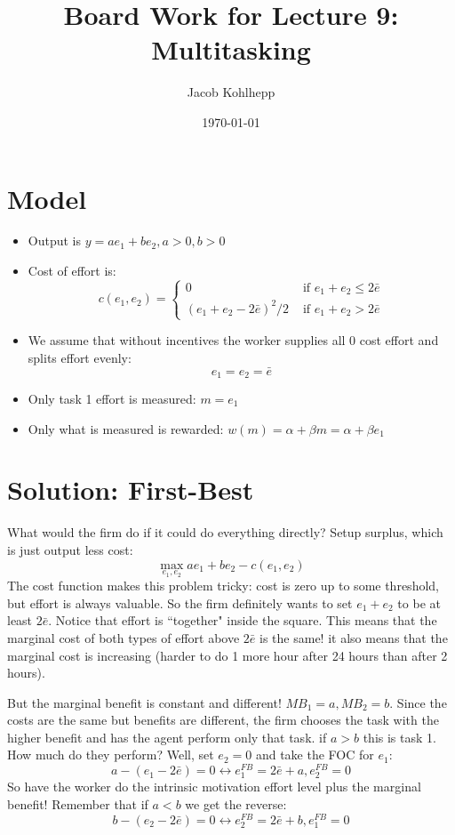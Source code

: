 \documentclass{article}
\title{Board Work for Lecture 9: Multitasking}
\author{Jacob Kohlhepp}
\date{\today}
\begin{document}
\maketitle



\section{Model}
\begin{itemize}
    \item Output is $y=a e_1+b e_2, a>0, b>0$
    \item Cost of effort is:
       \[c(e_1, e_2) = \begin{cases}
            0 & \text{ if }  e_1+e_2 \leq 2 \bar e \\
            (e_1+e_2-2\bar e)^2/2 & \text{ if } e_1+e_2 > 2 \bar e 
        \end{cases}\]
      \item We assume that without incentives the worker supplies all 0 cost effort and splits effort evenly:
      \[e_1=e_2=\bar e\]
    \item Only task 1 effort is measured: $m=e_1$
    \item Only what is measured is rewarded: $w(m)=\alpha + \beta m =\alpha + \beta e_1$
\end{itemize}

\section{Solution: First-Best}

What would the firm do if it could do everything directly? Setup surplus, which is just output less cost:
\[\max_{e_1, e_2} a e_1+b e_2-c(e_1, e_2)\]
The cost function makes this problem tricky: cost is zero up to some threshold, but effort is always valuable. So the firm definitely wants to set $e_1+e_2$ to be at least $2\bar e$. Notice that effort is ``together" inside the square. This means that the marginal cost of both types of effort above $2\bar e$ is the same! it also means that the marginal cost is increasing (harder to do 1 more hour after 24 hours than after 2 hours).

But the marginal benefit is constant and different! $MB_1=a, MB_2=b$. Since the costs are the same but benefits are different, the firm chooses the task with the higher benefit and has the agent perform only that task. if $a>b$ this is task 1. How much do they perform? Well, set $e_2=0$ and take the FOC for $e_1$:
\[a - (e_1-2\bar e)=0 \leftrightarrow e_1^{FB}=2\bar e +a, e_2^{FB}=0 \]
So have the worker do the intrinsic motivation effort level plus the marginal benefit! Remember that if $a<b$ we get the reverse:
\[b - (e_2-2\bar e)=0 \leftrightarrow e_2^{FB}=2\bar e +b, e_1^{FB}=0 \]
\end{document}
